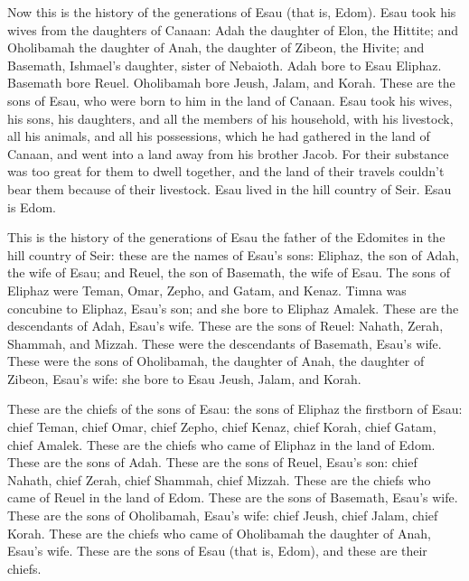 \mychapter{}
\myverse*{}Now this is the history of the generations of Esau (that is, Edom).   \myverse{}Esau took his wives from the daughters of Canaan: Adah the daughter of Elon, the Hittite; and Oholibamah the daughter of Anah, the daughter of Zibeon, the Hivite;   \myverse{}and Basemath, Ishmael’s daughter, sister of Nebaioth. \myverse{}Adah bore to Esau Eliphaz. Basemath bore Reuel.   \myverse{}Oholibamah bore Jeush, Jalam, and Korah. These are the sons of Esau, who were born to him in the land of Canaan.   \myverse{}Esau took his wives, his sons, his daughters, and all the members of his household, with his livestock, all his animals, and all his possessions, which he had gathered in the land of Canaan, and went into a land away from his brother Jacob.   \myverse{}For their substance was too great for them to dwell together, and the land of their travels couldn’t bear them because of their livestock.   \myverse{}Esau lived in the hill country of Seir. Esau is Edom.

\myverse{}This is the history of the generations of Esau the father of the Edomites in the hill country of Seir:   \myverse{}these are the names of Esau’s sons: Eliphaz, the son of Adah, the wife of Esau; and Reuel, the son of Basemath, the wife of Esau.   \myverse{}The sons of Eliphaz were Teman, Omar, Zepho, and Gatam, and Kenaz.   \myverse{}Timna was concubine to Eliphaz, Esau’s son; and she bore to Eliphaz Amalek. These are the descendants of Adah, Esau’s wife.   \myverse{}These are the sons of Reuel: Nahath, Zerah, Shammah, and Mizzah. These were the descendants of Basemath, Esau’s wife.   \myverse{}These were the sons of Oholibamah, the daughter of Anah, the daughter of Zibeon, Esau’s wife: she bore to Esau Jeush, Jalam, and Korah.

\myverse{}These are the chiefs of the sons of Esau: the sons of Eliphaz the firstborn of Esau: chief Teman, chief Omar, chief Zepho, chief Kenaz, \myverse{}chief Korah, chief Gatam, chief Amalek. These are the chiefs who came of Eliphaz in the land of Edom. These are the sons of Adah.   \myverse{}These are the sons of Reuel, Esau’s son: chief Nahath, chief Zerah, chief Shammah, chief Mizzah. These are the chiefs who came of Reuel in the land of Edom. These are the sons of Basemath, Esau’s wife.   \myverse{}These are the sons of Oholibamah, Esau’s wife: chief Jeush, chief Jalam, chief Korah. These are the chiefs who came of Oholibamah the daughter of Anah, Esau’s wife.   \myverse{}These are the sons of Esau (that is, Edom), and these are their chiefs.

